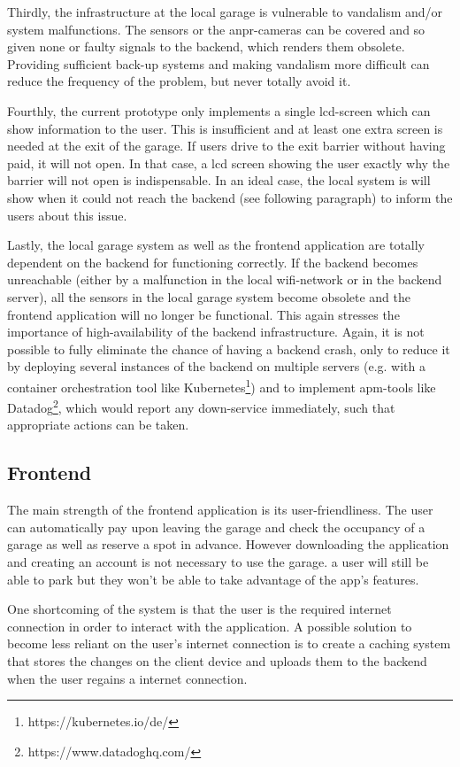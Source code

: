 \ind Thirdly, the infrastructure at the local garage is vulnerable to vandalism and/or system malfunctions. The sensors or the \ac{anpr}-cameras can be covered and so given none or faulty signals to the backend, which renders them obsolete. Providing sufficient back-up systems and making vandalism more difficult can reduce the frequency of the problem, but never totally avoid it.

\ind Fourthly, the current prototype only implements a single \ac{lcd}-screen which can show information to the user. This is insufficient and at least one extra screen is needed at the exit of the garage. If users drive to the exit barrier without having paid, it will not open. In that case, a \ac{lcd} screen showing the user exactly why the barrier will not open is indispensable. In an ideal case, the local system is will show when it could not reach the backend (see following paragraph) to inform the users about this issue.

\ind Lastly, the local garage system as well as the frontend application are totally dependent on the backend for functioning correctly. If the backend becomes unreachable (either by a malfunction in the local \ac{wifi}-network or in the backend server), all the sensors in the local garage system become obsolete and the frontend application will no longer be functional. This again stresses the importance of high-availability of the backend infrastructure. Again, it is not possible to fully eliminate the chance of having a backend crash, only to reduce it by deploying several instances of the backend on multiple servers (e.g. with a container orchestration tool like Kubernetes\footnote{https://kubernetes.io/de/}) and to implement \ac{apm}-tools like Datadog\footnote{https://www.datadoghq.com/}, which would report any down-service immediately, such that appropriate actions can be taken.

\subsection{Frontend}
The main strength of the frontend application is its user-friendliness. The user can automatically pay upon leaving the garage and check the occupancy of a garage as well as reserve a spot in advance. However downloading the application and creating an account is not necessary to use the garage. a user will still be able to park but they won't be able to take advantage of the app's features.

\ind One shortcoming of the system is that the user is the required internet connection in order to interact with the application. A possible solution to become less reliant on the user's internet connection is to create a caching system that stores the changes on the client device and uploads them to the backend when the user regains a internet connection.

